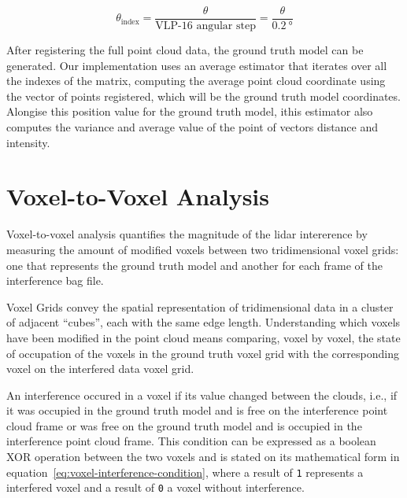 \begin{equation}
	\label{eq:azimuthal-angle-index}
	\theta_{\text{index}} = \frac{\theta}{\text{VLP-16 angular step}} = \frac{\theta}{\SI{0.2}{\degree}} 
\end{equation}


After registering the full point cloud data, the ground truth model can be generated. Our implementation uses an average estimator that iterates over all the indexes of the matrix, computing the average point cloud coordinate using the vector of points registered, which will be the ground truth model coordinates. Alongise this position value for the ground truth model, ithis estimator also computes the variance and average value of the point of vectors distance and intensity.





\section{Voxel-to-Voxel Analysis}
\label{sec:lidar-interference:voxel-analysis}
Voxel-to-voxel analysis quantifies the magnitude of the \ac{lidar} intererence by measuring the amount of modified voxels between two tridimensional voxel grids: one that represents the ground truth model and another for each frame of the interference bag file.

Voxel Grids convey the spatial representation of tridimensional data in a cluster of adjacent ``cubes'', each with the same edge length. Understanding which voxels have been modified in the point cloud means comparing, voxel by voxel, the state of occupation of the voxels in the ground truth voxel grid with the corresponding voxel on the interfered data voxel grid. 

An interference occured in a voxel if its value changed between the clouds, i.e., if it was occupied in the ground truth model and is free on the interference point cloud frame or was free on the ground truth model and is occupied in the interference point cloud frame. This condition can be expressed as a boolean XOR operation between the two voxels  and is stated on its mathematical form in equation~\ref{eq:voxel-interference-condition}, where a result of \texttt{1} represents a interfered voxel and a result of \texttt{0} a voxel without interference.

